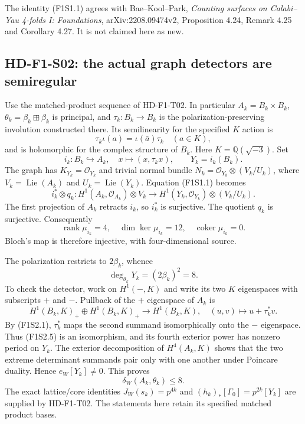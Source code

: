 The identity (F1S1.1) agrees with Bae--Kool--Park,
\emph{Counting surfaces on Calabi--Yau 4-folds I: Foundations},
arXiv:2208.09474v2, Proposition 4.24, Remark 4.25 and Corollary 4.27.
It is not claimed here as new.

\subsection{HD-F1-S02: the actual graph detectors are semiregular}

Use the matched-product sequence of HD-F1-T02. In particular
$A_k=B_k\times B_k$, $\theta_k=\beta_k\boxplus\beta_k$ is principal,
and $\tau_k:B_k\to B_k$ is the polarization-preserving involution
constructed there. Its semilinearity for the specified $K$ action is
\[
 \tau_k\iota(a)=\iota(\bar a)\tau_k\quad(a\in K),
 \tag{F1S2.1}
\]
and is holomorphic for the complex structure of $B_k$.
Here $K=\mathbb Q(\sqrt{-3})$. Set
\[
 i_k:B_k\hookrightarrow A_k,\quad x\longmapsto(x,\tau_kx),
 \qquad Y_k=i_k(B_k).
\]
The graph has $K_{Y_k}=\mathcal O_{Y_k}$ and trivial normal bundle
$N_k=\mathcal O_{Y_k}\otimes(V_k/U_k)$, where
$V_k=\operatorname{Lie}(A_k)$ and $U_k=\operatorname{Lie}(Y_k)$.
Equation (F1S1.1) becomes
\[
 i_k^*\otimes q_k:
 H^1(A_k,\mathcal O_{A_k})\otimes V_k
 \longrightarrow H^1(Y_k,\mathcal O_{Y_k})\otimes(V_k/U_k).
 \tag{F1S2.2}
\]
The first projection of $A_k$ retracts $i_k$, so $i_k^*$ is
surjective. The quotient $q_k$ is surjective. Consequently
\[
 \operatorname{rank}\mu_{i_k}=4,\quad
 \dim\ker\mu_{i_k}=12,\quad \operatorname{coker}\mu_{i_k}=0.
 \tag{F1S2.3}
\]
Bloch's map is therefore injective, with four-dimensional source.

The polarization restricts to $2\beta_k$, whence
\[
 \deg_{\theta_k}Y_k=(2\beta_k)^2=8.
 \tag{F1S2.4}
\]
To check the detector, work on $H^1(-,K)$ and write its two $K$
eigenspaces with subscripts $+$ and $-$. Pullback of the $+$
eigenspace of $A_k$ is
\[
 H^1(B_k,K)_+\oplus H^1(B_k,K)_+
  \longrightarrow H^1(B_k,K),\quad (u,v)\longmapsto u+\tau_k^*v.
 \tag{F1S2.5}
\]
By (F1S2.1), $\tau_k^*$ maps the second summand isomorphically
onto the $-$ eigenspace. Thus (F1S2.5) is an isomorphism, and its
fourth exterior power has nonzero period on $Y_k$.
The exterior decomposition of $H^4(A_k,K)$ shows that the two
extreme determinant summands pair only with one another under
Poincare duality. Hence $e_W[Y_k]\ne0$. This proves
\[
 \delta_W(A_k,\theta_k)\leq 8.
 \tag{F1S2.6}
\]
The exact lattice/core identities $J_W(s_k)=p^{4k}$ and
$(h_k)_*[\Gamma_0]=p^{2k}[Y_k]$ are supplied by HD-F1-T02.
The statements here retain its specified matched product bases.

